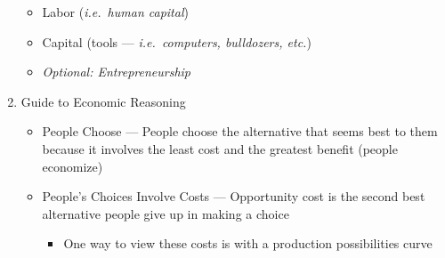 \documentclass[12pt]{article}
\begin{document}
\begin{enumerate}
\begin{itemize}
      \item Labor (\textit{i.e.\ human capital})

      \item Capital (tools — \textit{i.e.\ computers, bulldozers, etc.})

      \item \textit{Optional: Entrepreneurship}

    \end{itemize}

  \item Guide to Economic Reasoning

    \begin{itemize}

      \item People Choose — People choose the alternative that seems best to them because it involves the least cost and the greatest benefit (people economize)

      \item People's Choices Involve Costs — Opportunity cost is the second best alternative people give up in making a choice

        \begin{itemize}

          \item One way to view these costs is with a production possibilities curve

            \begin{center}

              
            \end{center}

        \end{itemize}


\end{itemize}
\end{enumerate}
\end{document}
